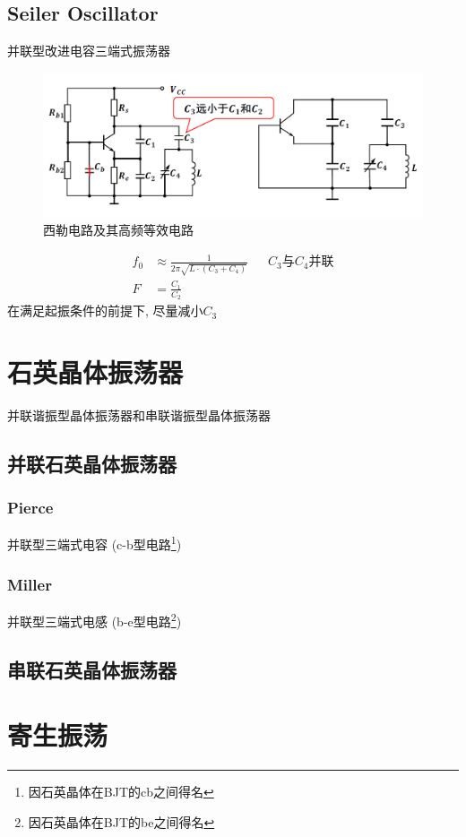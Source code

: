 \documentclass[a4paper]{report}
\begin{document}
\subsection{Seiler Oscillator}
并联型改进电容三端式振荡器
\begin{figure}[H]
\centering
\includegraphics[width=1\textwidth]{osc_seiler.png}
\caption{西勒电路及其高频等效电路}
\end{figure}
\begin{align*}
  f_0&\approx\frac{1}{2\pi\sqrt{L\cdot(C_3+C_4)}}&&\text{$C_3$与$C_4$并联}\\
  F&=\frac{C_1}{C_2}
\end{align*}
在满足起振条件的前提下, 尽量减小$C_3$

\section{石英晶体振荡器}
并联谐振型晶体振荡器和串联谐振型晶体振荡器
\subsection{并联石英晶体振荡器}
\subsubsection{Pierce}
并联型三端式电容 (c-b型电路\footnote{因石英晶体在BJT的cb之间得名})
\subsubsection{Miller}
并联型三端式电感 (b-e型电路\footnote{因石英晶体在BJT的be之间得名})
\subsection{串联石英晶体振荡器}
\section{寄生振荡}
\end{document}
